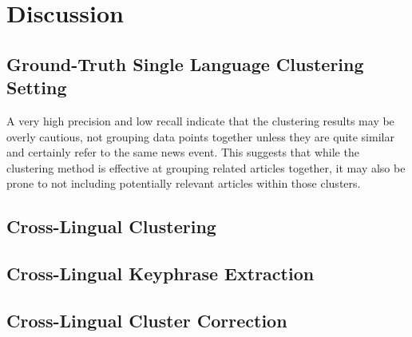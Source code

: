 \section{Discussion}\label{section:discussion}

\subsection{Ground-Truth Single Language Clustering Setting}
A very high precision and low recall indicate that the clustering results may be overly cautious, not grouping data points together unless they are quite similar and certainly refer to the same news event. 
This suggests that while the clustering method is effective at grouping related articles together, it may also be prone to not including potentially relevant articles within those clusters.



\subsection{Cross-Lingual Clustering}





\subsection{Cross-Lingual Keyphrase Extraction}



\subsection{Cross-Lingual Cluster Correction}
